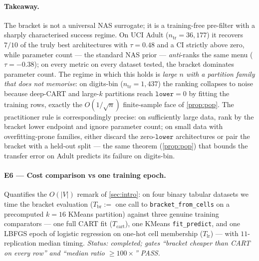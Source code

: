 \documentclass[10pt]{article}
\theoremstyle{definition}
\theoremstyle{remark}
\begin{document}
\paragraph{Takeaway.} The bracket is not a universal NAS
surrogate; it is a training-free pre-filter with a sharply
characterised success regime. On UCI Adult
($n_{\mathrm{tr}} = 36{,}177$) it recovers $7/10$ of the truly
best architectures with $\tau = 0.48$ and a CI strictly above
zero, while parameter count --- the standard NAS prior ---
\emph{anti}-ranks the same menu ($\tau = -0.38$); on every
metric on every dataset tested, the bracket dominates parameter
count. The regime in which this holds is \emph{large $n$ with a
partition family that does not memorise}: on digits-bin
($n_{\mathrm{tr}} = 1{,}437$) the ranking collapses to noise
because deep-CART and large-$k$ partitions reach
$\texttt{lower} = 0$ by fitting the training rows, exactly the
$O(1/\sqrt{n})$ finite-sample face of \cref{prop:pop}. The
practitioner rule is correspondingly precise: on sufficiently
large data, rank by the bracket lower endpoint and ignore
parameter count; on small data with overfitting-prone families,
either discard the zero-$\texttt{lower}$ architectures or pair
the bracket with a held-out split --- the same theorem
(\cref{prop:pop}) that bounds the transfer error on Adult
predicts its failure on digits-bin.

\paragraph{E6 --- Cost comparison vs one training epoch.}
Quantifies the $O(|V|)$ remark of \cref{sec:intro}: on four
binary tabular datasets we time the bracket evaluation
($T_{\mathrm{br}} := $ one call to \texttt{bracket\_from\_cells}
on a precomputed $k = 16$ KMeans partition) against three
genuine training comparators --- one full CART fit
($T_{\mathrm{cart}}$), one KMeans \texttt{fit\_predict}, and
one LBFGS epoch of logistic regression on one-hot cell
membership ($T_{\mathrm{lr}}$) --- with $11$-replication
median timing. \emph{Status: completed; gates ``bracket
cheaper than CART on every row'' and ``median ratio
$\ge 100\times$'' PASS.}
\end{document}
